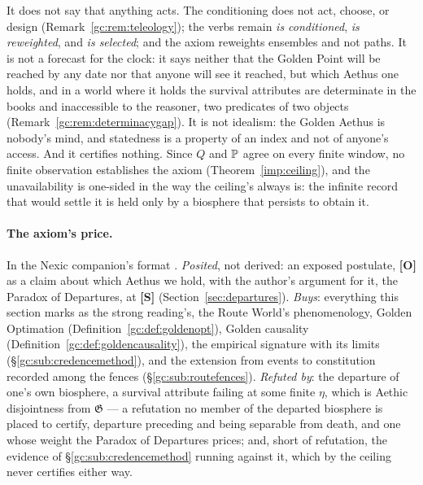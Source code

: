 \begin{remark}\label{gc:rem:axiomnot}
It does not say that anything acts. The conditioning does not act,
choose, or design (Remark~\ref{gc:rem:teleology}); the verbs remain
\emph{is conditioned}, \emph{is reweighted}, and \emph{is selected}; and
the axiom reweights ensembles and not paths. It is not a forecast for the
clock: it says neither that the Golden Point will be reached by any date
nor that anyone will see it reached, but which Aethus one holds, and in a
world where it holds the survival attributes are determinate in the books
and inaccessible to the reasoner, two predicates of two objects
(Remark~\ref{gc:rem:determinacygap}). It is not idealism: the Golden
Aethus is nobody's mind, and statedness is a property of an index and
not of anyone's access. And it certifies nothing. Since $Q$ and $\mathbb{P}$
agree on every finite window, no finite observation establishes the
axiom (Theorem~\ref{imp:ceiling}), and the unavailability is one-sided in
the way the ceiling's always is: the infinite record that would settle it
is held only by a biosphere that persists to obtain it.
\end{remark}

\paragraph{The axiom's price.}\label{gc:par:axiomprice} In the Nexic
companion's format \cite{Nexus}. \emph{Posited}, not derived: an exposed
postulate, \textbf{[O]} as a claim about which Aethus we hold, with the
author's argument for it, the Paradox of Departures, at \textbf{[S]}
(Section~\ref{sec:departures}). \emph{Buys}: everything this section
marks as the strong reading's, the Route World's phenomenology, Golden
Optimation (Definition~\ref{gc:def:goldenopt}), Golden causality
(Definition~\ref{gc:def:goldencausality}), the empirical signature with
its limits (\S\ref{gc:sub:credencemethod}), and the extension from
events to constitution recorded among the fences
(\S\ref{gc:sub:routefences}). \emph{Refuted by}:
the departure of one's own biosphere, a survival attribute failing at
some finite $\eta$, which is Aethic disjointness from $\mathfrak G$ --- a
refutation no member of the departed biosphere is placed to certify,
departure preceding and being separable from death, and one whose weight
the Paradox of Departures prices; and, short of refutation, the evidence
of \S\ref{gc:sub:credencemethod} running against it, which by the
ceiling never certifies either way.


